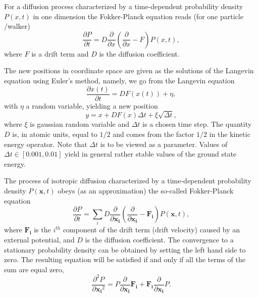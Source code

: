 \documentclass[graybox,sectrefs,envcountresetchap,open=right]{svmonodo}
\begin{document}
For a diffusion process characterized by a time-dependent probability density $P(x,t)$ in one dimension the Fokker-Planck
equation reads (for one particle /walker) 
\[
   \frac{\partial P}{\partial t} = D\frac{\partial }{\partial x}\left(\frac{\partial }{\partial x} -F\right)P(x,t),
\]
where $F$ is a drift term and $D$ is the diffusion coefficient. 







The new positions in coordinate space are given as the solutions of the Langevin equation using Euler's method, namely,
we go from the Langevin equation
\[ 
   \frac{\partial x(t)}{\partial t} = DF(x(t)) +\eta,
\]
with $\eta$ a random variable,
yielding a new position 
\[
   y = x+DF(x)\Delta t +\xi\sqrt{\Delta t},
\]
where $\xi$ is gaussian random variable and $\Delta t$ is a chosen time step. 
The quantity $D$ is, in atomic units, equal to $1/2$ and comes from the factor $1/2$ in the kinetic energy operator. Note that $\Delta t$ is to be viewed as a parameter. Values of $\Delta t \in [0.001,0.01]$ yield in general rather stable values of the ground state energy.  





The process of isotropic diffusion characterized by a time-dependent probability density $P(\mathbf{x},t)$ obeys (as an approximation) the so-called Fokker-Planck equation 
\[
   \frac{\partial P}{\partial t} = \sum_i D\frac{\partial }{\partial \mathbf{x_i}}\left(\frac{\partial }{\partial \mathbf{x_i}} -\mathbf{F_i}\right)P(\mathbf{x},t),
\]
where $\mathbf{F_i}$ is the $i^{th}$ component of the drift term (drift velocity) caused by an external potential, and $D$ is the diffusion coefficient. The convergence to a stationary probability density can be obtained by setting the left hand side to zero. The resulting equation will be satisfied if and only if all the terms of the sum are equal zero,
\[
\frac{\partial^2 P}{\partial {\mathbf{x_i}^2}} = P\frac{\partial}{\partial {\mathbf{x_i}}}\mathbf{F_i} + \mathbf{F_i}\frac{\partial}{\partial {\mathbf{x_i}}}P.
\]
\end{document}
